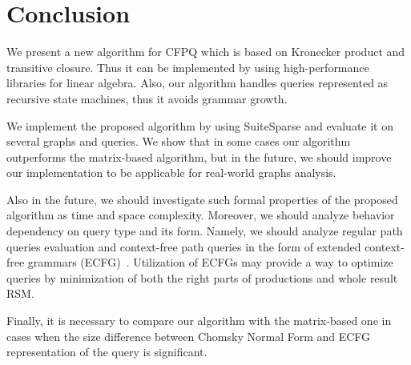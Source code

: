 \section{Conclusion}

We present a new algorithm for CFPQ which is based on Kronecker product and transitive closure.
Thus it can be implemented by using high-performance libraries for linear algebra. Also, our algorithm handles queries represented as recursive state machines, thus it avoids grammar growth.

We implement the proposed algorithm by using SuiteSparse and evaluate it on several graphs and queries.
We show that in some cases our algorithm outperforms the matrix-based algorithm, but in the future, we should improve our implementation to be applicable for real-world graphs analysis. 

Also in the future, we should investigate such formal properties of the proposed algorithm as time and space complexity.
Moreover, we should analyze behavior dependency on query type and its form. Namely, we should analyze regular path queries evaluation and context-free path queries in the form of extended context-free grammars (ECFG)~\cite{10.1007/978-3-642-00982-2_35}.
Utilization of ECFGs may provide a way to optimize queries by minimization of both the right parts of productions and whole result RSM.

Finally, it is necessary to compare our algorithm with the matrix-based one in cases when the size difference between Chomsky Normal Form and ECFG representation of the query is significant.